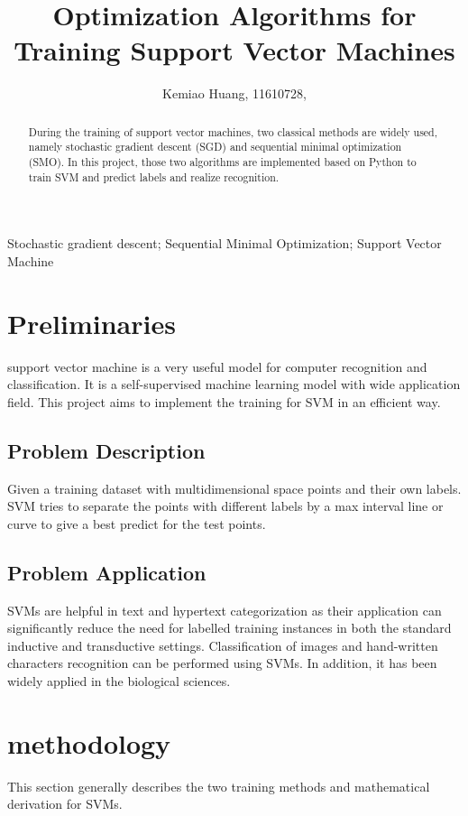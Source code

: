 \documentclass[9pt,shortpaper,twoside,web]{ieeecolor}
\begin{document}
\title{\bigskip\bigskip Optimization Algorithms for Training Support Vector Machines}
\author{Kemiao Huang, 11610728, }
\maketitle

\begin{abstract}
During the training of support vector machines, two classical methods are widely used, namely stochastic gradient descent (SGD) and sequential minimal optimization (SMO). In this project, those two algorithms are implemented based on Python to train SVM and predict labels and realize recognition. 
\end{abstract}

\begin{IEEEkeywords}
Stochastic gradient descent; Sequential Minimal Optimization; Support Vector Machine
\end{IEEEkeywords}

\section{Preliminaries}
\label{sec:preliminaries}
 support vector machine is a very useful model for computer recognition and classification. It is a self-supervised machine learning model with wide application field. This project aims to implement the training for SVM in an efficient way.
\subsection{Problem Description}
Given a training dataset with multidimensional space points and their own labels. SVM tries to separate the points with different labels by a max interval line or curve to give a best predict for the test points.

\subsection{Problem Application}
SVMs are helpful in text and hypertext categorization as their application can significantly reduce the need for labelled training instances in both the standard inductive and transductive settings. Classification of images and hand-written characters recognition can be performed using SVMs. In addition, it has been widely applied in the biological sciences.

\section{methodology}
This section generally describes the two training methods and mathematical derivation for SVMs.
\end{document}

